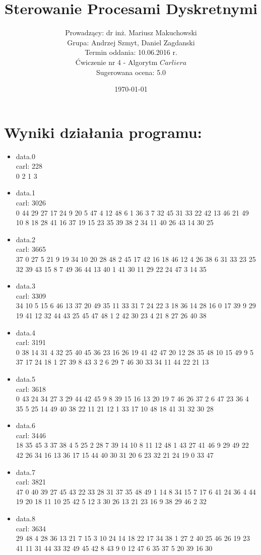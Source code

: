 \documentclass[11pt]{article}
\title{\textbf{Sterowanie Procesami Dyskretnymi}\\}
\author{Prowadzący: dr inż. Mariusz Makuchowski\\Grupa: Andrzej Szmyt, Daniel Zagdanski \\Termin oddania: 10.06.2016 r.\\Ćwiczenie nr 4 - Algorytm $Carliera$ \\Sugerowana ocena: 5.0}
\date{\today}
\begin{document}
\maketitle

\section{Wyniki działania programu:}

\begin{tiny}
\begin{itemize}
\item data.0\\carl: 228\\0 2 1 3 
\item data.1\\
carl: 3026\\
0 44 29 27 17 24 9 20 5 47 4 12 48 6 1 36 3 7 32 45 31 33 22 42 13 46 21 49 10 8 18 28 41 16 37 19 15 23 35 39 38 2 34 11 40 26 43 14 30 25 
\item data.2\\
carl: 3665\\
37 0 27 5 21 9 19 34 10 20 28 48 2 45 17 42 16 18 46 12 4 26 38 6 31 33 23 25 32 39 43 15 8 7 49 36 44 13 40 1 41 30 11 29 22 24 47 3 14 35
\item data.3\\
carl: 3309\\
34 10 5 15 6 46 13 37 20 49 35 11 33 31 7 24 22 3 18 36 14 28 16 0 17 39 9 29 19 41 12 32 44 43 25 45 47 48 1 2 42 30 23 4 21 8 27 26 40 38
\item data.4\\
carl: 3191\\
0 38 14 31 4 32 25 40 45 36 23 16 26 19 41 42 47 20 12 28 35 48 10 15 49 9 5 37 17 24 18 1 27 39 8 43 3 2 6 29 7 46 30 33 34 11 44 22 21 13
\item data.5\\
carl: 3618\\
0 43 24 34 27 3 29 44 42 45 9 8 39 15 16 13 20 19 7 46 26 37 2 6 47 23 36 4 35 5 25 14 49 40 38 22 11 21 12 1 33 17 10 48 18 41 31 32 30 28 
\item data.6\\
carl: 3446\\
18 35 45 3 37 38 4 5 25 2 28 7 39 14 10 8 11 12 48 1 43 27 41 46 9 29 49 22 42 26 34 16 13 36 17 15 44 40 30 31 20 6 23 32 21 24 19 0 33 47 
\item data.7\\
carl: 3821\\
47 0 40 39 27 45 43 22 33 28 31 37 35 48 49 1 14 8 34 15 7 17 6 41 24 36 4 44 19 20 18 11 10 25 42 5 12 3 30 26 13 21 23 16 9 38 29 46 2 32 
\item data.8\\
carl: 3634\\
29 48 4 28 36 13 21 7 15 3 10 24 14 18 22 17 34 38 1 27 2 40 25 46 26 19 23 41 11 31 44 33 32 49 45 42 8 43 9 0 12 47 6 35 37 5 20 39 16 30 
\end{itemize}
\end{tiny}
\end{document}
